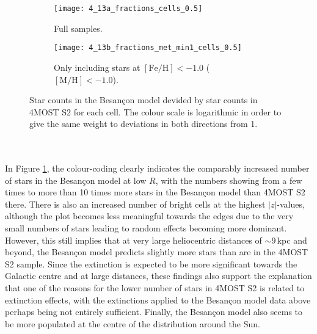 \documentclass[a4paper,11pt]{article}
\begin{document}
\begin{figure}
 \centering
 \begin{subfigure}[t]{0.83\textwidth}
  \texttt{[image: 4\_13a\_fractions\_cells\_0.5]}
  \caption{Full samples.}
  \label{fig:fractions_full_cells_05}
 \end{subfigure}
 \medskip
 \begin{subfigure}[t]{0.83\textwidth}
  \texttt{[image: 4\_13b\_fractions\_met\_min1\_cells\_0.5]}
  \caption{Only including stars at $\mathrm{[Fe/H]}<-1.0$ ($\mathrm{[M/H]}<-1.0$).}
  \label{fig:fractions_metcut_cells_05}
 \end{subfigure}
 \caption[Fraction of star counts between Besan\c{c}on model and 4MOST S2]{Star counts in the Besan\c{c}on model devided by star counts in 4MOST S2 for each cell. The colour scale is logarithmic in order to give the same weight to deviations in both directions from 1.}
 \label{fig:fractions_cells_05}
\end{figure}\\ \\
%
In Figure \ref{fig:fractions_full_cells_05}, the colour-coding clearly indicates the comparably increased number of stars in the Besan\c{c}on model at low $R$, with the numbers showing from a few times to more than 10 times more stars in the Besan\c{c}on model than 4MOST S2 there. There is also an increased number of bright cells at the highest $|z|$-values, although the plot becomes less meaningful towards the edges due to the very small numbers of stars leading to random effects becoming more dominant. However, this still implies that at very large heliocentric distances of ${\sim}9$\,kpc and beyond, the Besan\c{c}on model predicts slightly more stars than are in the 4MOST S2 sample. Since the extinction is expected to be more significant towards the Galactic centre and at large distances, these findings also support the explanation that one of the reasons for the lower number of stars in 4MOST S2 is related to extinction effects, with the extinctions applied to the Besan\c{c}on model data above perhaps being not entirely sufficient. Finally, the Besan\c{c}on model also seems to be more populated at the centre of the distribution around the Sun.\\ \\
%
\end{document}
